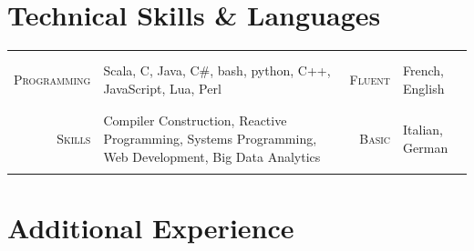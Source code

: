 \documentclass[a4paper,11pt]{article} %
\begin{document}
\section{Technical Skills \& Languages}
\begin{center}

\vspace{-0.3cm}
\begin{tabularx}{\textwidth}{rX|rl}

& & & \\
& & & \\
\textsc{\large{Programming}} & Scala, C, Java, C\#, bash, python, C++, JavaScript,
Lua, Perl &
\textsc{\large{Fluent}} & French, English \\
& & & \\
& & & \\
\textsc{\large{Skills}} & Compiler Construction, Reactive Programming, 
Systems Programming, Web Development, Big Data Analytics &
\textsc{\large{Basic}} & Italian, German \\
& & & \\

\end{tabularx}

\end{center}

\pagebreak
{}



\section{Additional Experience}
\end{document}

